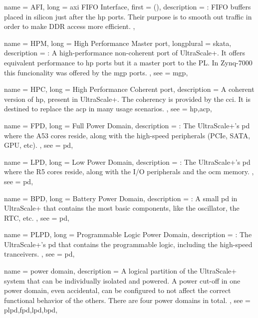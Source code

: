 {
	name = {AFI},
	long = {\gls{axi} FIFO Interface},
	first = { ()},
	description = {\emph{}:
		FIFO buffers placed in silicon just after the \gls{hp} ports. 
		Their purpose is to smooth out traffic in order to make DDR access more efficient.
	},
}

{
	name = {HPM},
	long = {High Performance Master port},
	longplural = {skata},
	description = {\emph{}:
		A high-performance non-coherent port of UltraScale+. 
		It offers equivalent performance to \gls{hp} ports but it a master port to the PL.
		In Zynq-7000 this funcionality was offered by the \gls{mgp} ports.
	},
	see = {mgp},
}

{
	name = {HPC},
	long = {High Performance Coherent port},
	description = {
		A coherent version of \gls{hp}, present in UltraScale+.
		The coherency is provided by the \gls{cci}.
		It is destined to replace the \gls{acp} in many usage scenarios.
	},
	see = {hp,acp},
}


{
	name = {FPD},
	long = {Full Power Domain},
	description = {\emph{}:
		The UltraScale+'s \gls{pd} where the A53 cores reside,
		along with the high-speed peripherals (PCIe, SATA, GPU, etc).
	},
	see = {pd},
}

{
	name = {LPD},
	long = {Low Power Domain},
	description = {\emph{}:
		The UltraScale+'s \gls{pd} where the R5 cores reside,
		along with the I/O peripherals and the \gls{ocm} memory.
	},
	see = {pd},
}

{
	name = {BPD},
	long = {Battery Power Domain},
	description = {\emph{}:
		A small \gls{pd} in UltraScale+ 
		that contains the most basic components,
		like the oscillator, the RTC, etc.
	},
	see = {pd},
}

{
	name = {PLPD},
	long = {Programmable Logic Power Domain},
	description = {\emph{}:
		The UltraScale+'s \gls{pd} that contains the
		programmable logic, including
		the high-speed tranceivers.
	},
	see = {pd},
}


{
	name = {power domain},
	description = {
		A logical partition of the UltraScale+ system that 
		can be individually isolated and powered.
		A power cut-off in one power domain, even accidental,
		can be configured to not affect the correct functional behavior
		of the others.
		There are four power domains in total.
	},
	see = {plpd,fpd,lpd,bpd},
}

